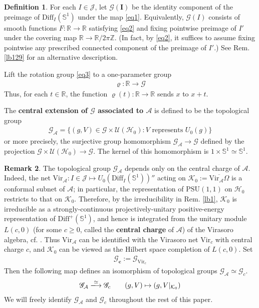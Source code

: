 \documentclass[11pt,b5paper,notitlepage]{article}
\theoremstyle{definition}
\newtheorem{df}{Definition}[section]
\newtheorem{rem}[df]{Remark}
\theoremstyle{plain}
\newcommand{\ovl}{\overline}
\newcommand{\Diff}{\mathrm{Diff}}
\newcommand{\DiffS}{\mathrm{Diff}^+(\mathbb S^1)}
\newcommand{\PSU}{\mathrm{PSU}(1,1)}
\newcommand{\Vir}{\mathrm{Vir}}
\newcommand{\GA}{\mathscr G_{\mathcal A}}
\newcommand{\Zbb}{\mathbb Z}
\newcommand{\Rbb}{\mathbb R}
\newcommand{\Sbb}{{\mathbb S}}
\newcommand{\Gc}{\mathscr G_c}
\newcommand{\MA}{\mathcal A}
\newcommand{\MH}{\mathcal H}
\newcommand{\MJ}{\mathcal J}
\newcommand{\MU}{\mathcal U}
\newcommand{\MK}{\mathcal K}
\newcommand{\SG}{\mathscr G}
\numberwithin{equation}{section}
\begin{document}
\begin{df}\label{lb123}
For each $I\in\MJ$, let $\pmb{\SG(I)}$ be the identity component of the preimage of $\Diff_I(\Sbb^1)$ under the map \eqref{eq1}. Equivalently, $\SG(I)$ consists of smooth functions $F:\Rbb\rightarrow\Rbb$ satisfying \eqref{eq2} and fixing pointwise preimage of $I'$ under the covering map $\Rbb\rightarrow\Rbb/2\pi\Zbb$. (In fact, by \eqref{eq2}, it suffices to assume fixing pointwise any prescribed connected component of the preimage of $I'$.) See Rem. \ref{lb129} for an alternative description.
\end{df}



Lift the rotation group \eqref{eq3} to a one-parameter group
\begin{align*}
\pmb{\varrho}:\Rbb\rightarrow\SG
\end{align*}
Thus, for each $t\in\Rbb$, the function $\varrho(t):\Rbb\rightarrow\Rbb$ sends $x$ to $x+t$.


The \textbf{central extension of $\SG$ associated to $\MA$} is defined to be the topological group
\begin{align*}
\pmb{\GA}=\{(g,V)\in\SG\times\MU(\MH_0):V\text{ represents }U_0(g)\}
\end{align*}
or more precisely, the surjective group homomorphism $\GA\rightarrow\SG$ defined by the projection $\SG\times\MU(\MH_0)\rightarrow\SG$. The kernel of this homomorphism is $1\times\Sbb^1\simeq\Sbb^1$. 


\begin{rem}\label{lb39}
The topological group $\GA$ depends only on the central charge of $\MA$. Indeed, the net $\Vir_\MA:I\in\MJ\mapsto U_0(\Diff_I(\Sbb^1))''$ acting on $\MK_0:=\ovl{\Vir_\MA\Omega}$ is a conformal subnet of $\MA$; in particular, the representation of $\PSU$ on $\MH_0$ restricts to that on $\MK_0$. Therefore, by the irreducibility in Rem. \ref{lb1}, $\MK_0$ is irreducible as a strongly-continuous projectively-unitary positive-energy representation of $\DiffS$, and hence is integrated from the unitary module $L(c,0)$ (for some $c\geq0$, called the \textbf{central charge} of $\MA$) of the Virasoro algebra, cf. \cite[Thm. A.1]{Car04}. Thus $\Vir_\MA$ can be identified with the Virasoro net $\Vir_c$ with central charge $c$, and $\MK_0$ can be viewed as the Hilbert space completion of $L(c,0)$. Set
\begin{align*}
\pmb{\Gc}:=\SG_{\Vir_c}
\end{align*}
Then the following map defines an isomorphism of topological groups $\GA\simeq\Gc$.
\begin{align*}
\GA\xlongrightarrow{\simeq}\Gc \qquad (g,V)\mapsto (g,V|_{\MK_0})
\end{align*}
We will freely identify $\GA$ and $\Gc$ throughout the rest of this paper.
\end{rem}
\end{document}
